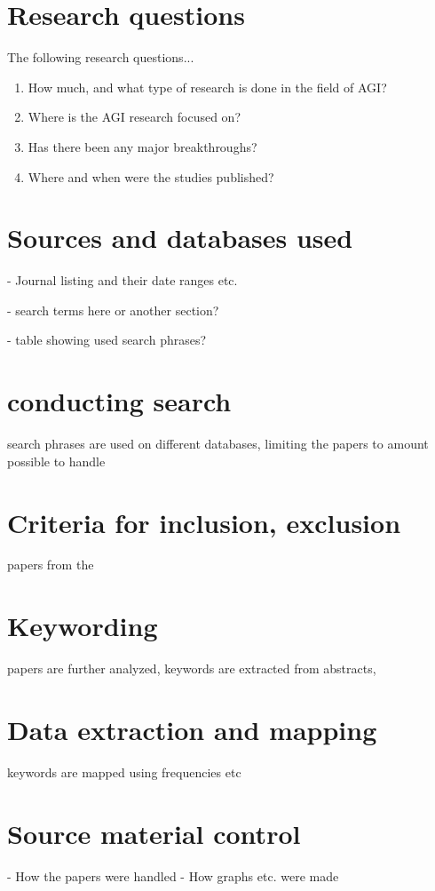 \documentclass[utf8,english]{gradu3}
\begin{document}
\section{Research questions}

The following research questions...


\begin{enumerate}
  \item How much, and what type of research is done in the field of AGI?
  \item Where is the AGI research focused on?
  \item Has there been any major breakthroughs?
  \item Where and when were the studies published?
\end{enumerate}

\section{Sources and databases used}
- Journal listing and their date ranges etc.

- search terms here or another section? 

- table showing used search phrases?

\section{conducting search}
search phrases are used on different databases, limiting the papers to amount possible to handle

\section{Criteria for inclusion, exclusion}
papers from the 

\section{Keywording}
papers are further analyzed, keywords are extracted from abstracts, 

\section{Data extraction and mapping}
keywords are mapped using frequencies etc

\section{Source material control}
- How the papers were handled
- How graphs etc. were made
\end{document}

